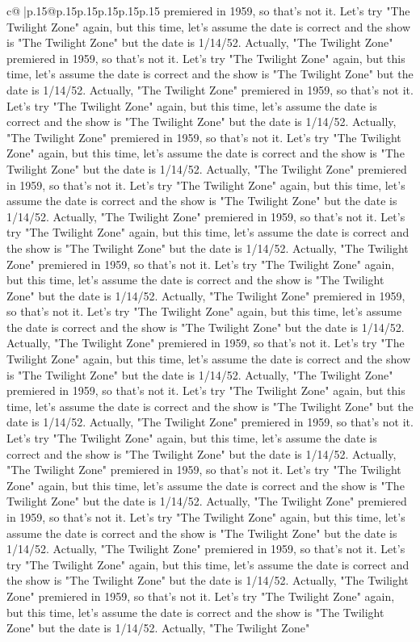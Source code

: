 \documentclass{article}
\begin{document}
{\begin{supertabular}{c@{$\;$}|p{.15\linewidth}@{}p{.15\linewidth}p{.15\linewidth}p{.15\linewidth}p{.15\linewidth}p{.15\linewidth}}
{{{premiered in 1959, so that's not it. Let's try "The Twilight Zone" again, but this time, let's assume the date is correct and the show is "The Twilight Zone" but the date is 1/14/52. Actually, "The Twilight Zone" premiered in 1959, so that's not it. Let's try "The Twilight Zone" again, but this time, let's assume the date is correct and the show is "The Twilight Zone" but the date is 1/14/52. Actually, "The Twilight Zone" premiered in 1959, so that's not it. Let's try "The Twilight Zone" again, but this time, let's assume the date is correct and the show is "The Twilight Zone" but the date is 1/14/52. Actually, "The Twilight Zone" premiered in 1959, so that's not it. Let's try "The Twilight Zone" again, but this time, let's assume the date is correct and the show is "The Twilight Zone" but the date is 1/14/52. Actually, "The Twilight Zone" premiered in 1959, so that's not it. Let's try "The Twilight Zone" again, but this time, let's assume the date is correct and the show is "The Twilight Zone" but the date is 1/14/52. Actually, "The Twilight Zone" premiered in 1959, so that's not it. Let's try "The Twilight Zone" again, but this time, let's assume the date is correct and the show is "The Twilight Zone" but the date is 1/14/52. Actually, "The Twilight Zone" premiered in 1959, so that's not it. Let's try "The Twilight Zone" again, but this time, let's assume the date is correct and the show is "The Twilight Zone" but the date is 1/14/52. Actually, "The Twilight Zone" premiered in 1959, so that's not it. Let's try "The Twilight Zone" again, but this time, let's assume the date is correct and the show is "The Twilight Zone" but the date is 1/14/52. Actually, "The Twilight Zone" premiered in 1959, so that's not it. Let's try "The Twilight Zone" again, but this time, let's assume the date is correct and the show is "The Twilight Zone" but the date is 1/14/52. Actually, "The Twilight Zone" premiered in 1959, so that's not it. Let's try "The Twilight Zone" again, but this time, let's assume the date is correct and the show is "The Twilight Zone" but the date is 1/14/52. Actually, "The Twilight Zone" premiered in 1959, so that's not it. Let's try "The Twilight Zone" again, but this time, let's assume the date is correct and the show is "The Twilight Zone" but the date is 1/14/52. Actually, "The Twilight Zone" premiered in 1959, so that's not it. Let's try "The Twilight Zone" again, but this time, let's assume the date is correct and the show is "The Twilight Zone" but the date is 1/14/52. Actually, "The Twilight Zone" premiered in 1959, so that's not it. Let's try "The Twilight Zone" again, but this time, let's assume the date is correct and the show is "The Twilight Zone" but the date is 1/14/52. Actually, "The Twilight Zone" premiered in 1959, so that's not it. Let's try "The Twilight Zone" again, but this time, let's assume the date is correct and the show is "The Twilight Zone" but the date is 1/14/52. Actually, "The Twilight Zone" premiered in 1959, so that's not it. Let's try "The Twilight Zone" again, but this time, let's assume the date is correct and the show is "The Twilight Zone" but the date is 1/14/52. Actually, "The Twilight Zone" }}}
\end{supertabular}}
\end{document}
